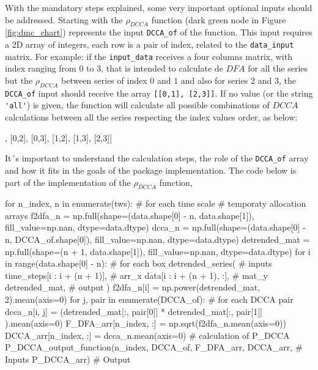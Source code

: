 \documentclass[article]{jss}
\begin{document}
With the mandatory steps explained, some very important optional inputs should be addressed. Starting with the $\rho_{DCCA}$ function (dark green node in Figure \ref{fig:dmc_chart}) represents the input \verb"DCCA_of" of the function. This input requires a 2D array of integers, each row is a pair of index, related to the \verb"data_input" matrix. For example: if the \verb"input_data" receives a four columns matrix, with index ranging from $0$ to $3$, that is intended to calculate de $DFA$ for all the series but the $\rho_{DCCA}$ between series of index $0$ and $1$ and also for series $2$ and $3$, the \verb"DCCA_of" input should receive the array \verb"[[0,1], [2,3]]". If no value (or the string \verb"'all'") is given, the function will calculate all possible combinations of $DCCA$ calculations between all the series respecting the index values order, as below:

\begin{Code}
[[0,1], [0,2], [0,3], [1,2], [1,3], [2,3]]
\end{Code}

It´s important to understand the calculation steps, the role of the \verb"DCCA_of" array and how it fits in the goals of the package implementation. The code below is part of the  implementation of the $\rho_{DCCA}$ function, 

\begin{Code}
for n_index, n  in enumerate(tws): # for each time scale
  # temporaty allocation arrays
  f2dfa_n = np.full(shape=(data.shape[0] - n, data.shape[1]),
  fill_value=np.nan, dtype=data.dtype)
  dcca_n = np.full(shape=(data.shape[0] - n, DCCA_of.shape[0]), 
  fill_value=np.nan, dtype=data.dtype)
  detrended_mat = np.full(shape=(n + 1, data.shape[1]), 
  fill_value=np.nan, dtype=data.dtype)
  for i in range(data.shape[0] - n): # for each box
      detrended_series( # inputs
                        time_steps[i : i + (n + 1)],  # arr_x
                        data[i : i + (n + 1), :],  # mat_y
                         detrended_mat,  # output
                      )
      f2dfa_n[i] = np.power(detrended_mat, 2).mean(axis=0)
      for j, pair in enumerate(DCCA_of): # for each DCCA pair
          dcca_n[i, j] = (detrended_mat[:, pair[0]] * detrended_mat[:, pair[1]]
                         ).mean(axis=0)
  F_DFA_arr[n_index, :] = np.sqrt(f2dfa_n.mean(axis=0))
  DCCA_arr[n_index, :] = dcca_n.mean(axis=0)
  # calculation of P_DCCA
  P_DCCA_output_function(n_index, DCCA_of, F_DFA_arr, DCCA_arr, # Inputs
  P_DCCA_arr) # Output
\end{Code}
\end{document}
